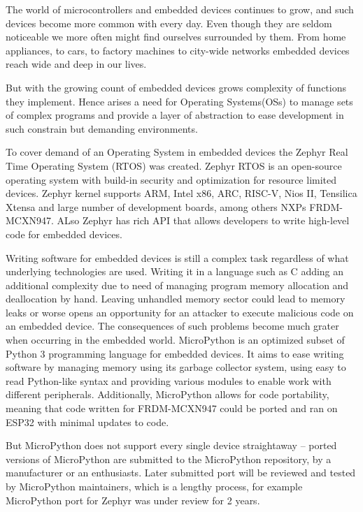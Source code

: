 \documentclass[twoside, 12pt]{article}
\begin{document}
\obsah

\listoffigures

\lstlistoflistings

The world of microcontrollers and embedded devices continues to grow, and such devices become 
more common with every day. Even though they are seldom noticeable we more often might find 
ourselves surrounded by them. From home appliances, to cars, to factory machines to city-wide 
networks embedded devices reach wide and deep in our lives.

But with the growing count of embedded devices grows complexity of functions they implement. 
Hence arises a need for Operating Systems(OSs) to manage sets of complex programs and provide 
a layer of abstraction to ease development in such constrain but demanding environments.

To cover demand of an Operating System in embedded devices the Zephyr Real Time Operating 
System (RTOS) was created. Zephyr RTOS is an open-source operating system with build-in 
security and optimization for resource limited devices. Zephyr kernel supports ARM, Intel 
x86, ARC, RISC-V, Nios II, Tensilica Xtensa and large number of development boards, among 
others NXPs FRDM-MCXN947. ALso Zephyr has rich API that allows developers to write high-level 
code for embedded devices.

Writing software for embedded devices is still a complex task regardless of what underlying 
technologies are used. Writing it in a language such as C adding an additional complexity
due to need of managing program memory allocation and deallocation by hand.
Leaving unhandled memory sector could lead to memory leaks or worse opens an opportunity for
an attacker to execute malicious code on an embedded device. The consequences of such problems
become much grater when occurring in the embedded world. MicroPython is an optimized subset 
of Python 3 programming language for embedded devices. It aims to ease writing software by 
managing memory using its garbage collector system, using easy to read Python-like syntax and 
providing various modules to enable work with different peripherals. Additionally, 
MicroPython allows for code portability, meaning that code written for FRDM-MCXN947
could be ported and ran on ESP32 with minimal updates to code. 

But MicroPython does not 
support every single device straightaway -- ported versions of MicroPython are submitted to 
the MicroPython repository, by a manufacturer or an enthusiasts. Later submitted port will be 
reviewed and tested by MicroPython maintainers, which is a lengthy process, for example 
MicroPython port for Zephyr was under review for 2 years.
\end{document}
